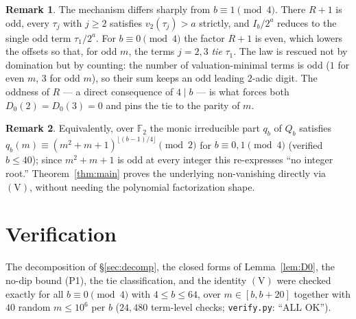 \documentclass[11pt]{article}
\theoremstyle{definition}
\newtheorem{remark}{Remark}
\newcommand{\vtwo}{v_2}
\begin{document}
\begin{remark}
The mechanism differs sharply from $b\equiv1\pmod4$. There $R+1$ is odd, every
$\tau_j$ with $j\ge2$ satisfies $\vtwo(\tau_j)>a$ strictly, and $I_b/2^a$ reduces to
the single odd term $\tau_1/2^a$. For $b\equiv0\pmod4$ the factor $R+1$ is even,
which lowers the offsets so that, for odd $m$, the terms $j=2,3$ \emph{tie} $\tau_1$.
The law is rescued not by domination but by counting: the number of
valuation-minimal terms is odd ($1$ for even $m$, $3$ for odd $m$), so their sum
keeps an odd leading $2$-adic digit. The oddness of $R$ --- a direct consequence of
$4\mid b$ --- is what forces both $D_0(2)=D_0(3)=0$ and pins the tie to the parity
of $m$.
\end{remark}

\begin{remark}
Equivalently, over $\mathbb F_2$ the monic irreducible part $q_b$ of $Q_b$ satisfies
$q_b(m)\equiv (m^2+m+1)^{\lfloor(b-1)/4\rfloor}\pmod2$ for $b\equiv0,1\pmod4$
(verified $b\le40$); since $m^2+m+1$ is odd at every integer this re-expresses
``no integer root.'' Theorem~\ref{thm:main} proves the underlying non-vanishing
directly via $(\mathrm V)$, without needing the polynomial factorization shape.
\end{remark}

\section*{Verification}
The decomposition of \S\ref{sec:decomp}, the closed forms of Lemma~\ref{lem:D0},
the no-dip bound (P1), the tie classification, and the identity $(\mathrm V)$ were
checked exactly for all $b\equiv0\pmod4$ with $4\le b\le 64$, over
$m\in[b,b+20]$ together with $40$ random $m\le 10^6$ per $b$ ($24{,}480$ term-level
checks; \texttt{verify.py}: ``ALL OK'').
\end{document}
